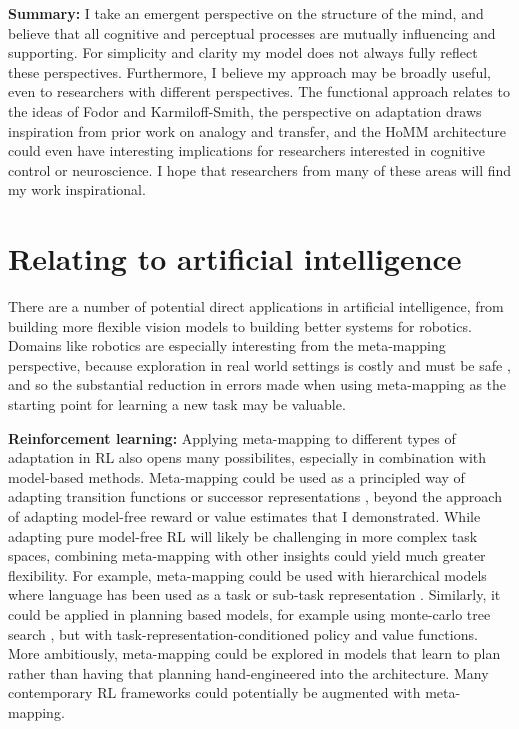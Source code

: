\textbf{Summary:} I take an emergent perspective on the structure of the mind, and believe that all cognitive and perceptual processes are mutually influencing and supporting. For simplicity and clarity my model does not always fully reflect these perspectives. Furthermore, I believe my approach may be broadly useful, even to researchers with different perspectives. The functional approach relates to the ideas of Fodor and Karmiloff-Smith, the perspective on adaptation draws inspiration from prior work on analogy and transfer, and the HoMM architecture could even have interesting implications for researchers interested in cognitive control or neuroscience. I hope that researchers from many of these areas will find my work inspirational.

\section{Relating to artificial intelligence}

There are a number of potential direct applications in artificial intelligence, from building more flexible vision models to building better systems for robotics. Domains like robotics are especially interesting from the meta-mapping perspective, because exploration in real world settings is costly and must be safe \citep{Turchetta2016}, and so the substantial reduction in errors made when using meta-mapping as the starting point for learning a new task may be valuable. \par 

\textbf{Reinforcement learning:} Applying meta-mapping to different types of adaptation in RL also opens many possibilites, especially in combination with model-based methods. Meta-mapping could be used as a principled way of adapting transition functions or successor representations \citep[c.f.][]{Madarasz2019}, beyond the approach of adapting model-free reward or value estimates that I demonstrated. While adapting pure model-free RL will likely be challenging in more complex task spaces, combining meta-mapping with other insights could yield much greater flexibility. For example, meta-mapping could be used with hierarchical models where language has been used as a task or sub-task representation \citep[e.g.][]{Jiang2019}. Similarly, it could be applied in planning based models, for example using monte-carlo tree search \citep[as in e.g.][]{Silver2016, Silver2017}, but with task-representation-conditioned policy and value functions. More ambitiously, meta-mapping could be explored in models that learn to plan \citep{Guez2019} rather than having that planning hand-engineered into the architecture. Many contemporary RL frameworks could potentially be augmented with meta-mapping. \par

